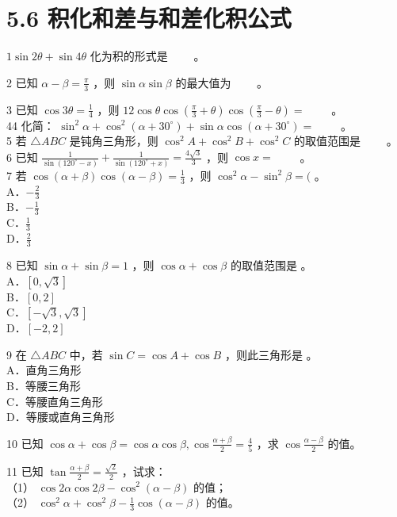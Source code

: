 \documentclass[10pt]{article}
\begin{document}
\section*{5.6 积化和差与和差化积公式}
\(1 \sin 2 \theta+\sin 4 \theta\) 化为积的形式是 \(\qquad\)。

2 已知 \(\alpha-\beta=\frac{\pi}{3}\) ，则 \(\sin \alpha \sin \beta\) 的最大值为 \(\qquad\)。

3 已知 \(\cos 3 \theta=\frac{1}{4}\) ，则 \(12 \cos \theta \cos \left(\frac{\pi}{3}+\theta\right) \cos \left(\frac{\pi}{3}-\theta\right)=\) \(\qquad\)。\\
44 化简： \(\sin ^{2} \alpha+\cos ^{2}\left(\alpha+30^{\circ}\right)+\sin \alpha \cos \left(\alpha+30^{\circ}\right)=\) \(\qquad\)。\\
5 若 \(\triangle A B C\) 是钝角三角形，则 \(\cos ^{2} A+\cos ^{2} B+\cos ^{2} C\) 的取值范围是 \(\qquad\)。\\
6 已知 \(\frac{1}{\sin \left(120^{\circ}-x\right)}+\frac{1}{\sin \left(120^{\circ}+x\right)}=\frac{4 \sqrt{3}}{3}\) ，则 \(\cos x=\) \(\qquad\)。\\
7 若 \(\cos (\alpha+\beta) \cos (\alpha-\beta)=\frac{1}{3}\) ，则 \(\cos ^{2} \alpha-\sin ^{2} \beta=(\) 。\\
A．\(-\frac{2}{3}\)\\
B．\(-\frac{1}{3}\)\\
C．\(\frac{1}{3}\)\\
D．\(\frac{2}{3}\)

8 已知 \(\sin \alpha+\sin \beta=1\) ，则 \(\cos \alpha+\cos \beta\) 的取值范围是 。\\
A．\([0, \sqrt{3}]\)\\
B．\([0,2]\)\\
C．\([-\sqrt{3}, \sqrt{3}]\)\\
D．\([-2,2]\)

9 在 \(\triangle A B C\) 中，若 \(\sin C=\cos A+\cos B\) ，则此三角形是 。\\
A．直角三角形\\
B．等腰三角形\\
C．等腰直角三角形\\
D．等腰或直角三角形

10 已知 \(\cos \alpha+\cos \beta=\cos \alpha \cos \beta, \cos \frac{\alpha+\beta}{2}=\frac{4}{5}\) ，求 \(\cos \frac{\alpha-\beta}{2}\) 的值。

11 已知 \(\tan \frac{\alpha+\beta}{2}=\frac{\sqrt{2}}{2}\) ，试求：\\
（1） \(\cos 2 \alpha \cos 2 \beta-\cos ^{2}(\alpha-\beta)\) 的值；\\
（2） \(\cos ^{2} \alpha+\cos ^{2} \beta-\frac{1}{3} \cos (\alpha-\beta)\) 的值。
\end{document}
